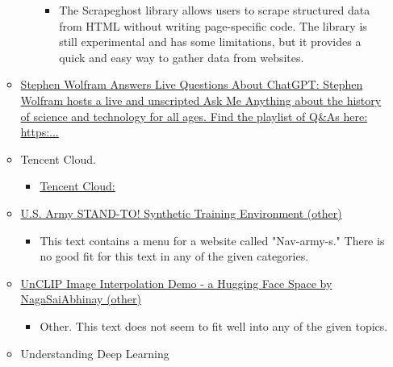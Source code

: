 \begin{itemize}
\begin{itemize}
\begin{itemize}
      \begin{itemize}
       
      \item
        The Scrapeghost library allows users to scrape structured data
        from HTML without writing page-specific code. The library is
        still experimental and has some limitations, but it provides a
        quick and easy way to gather data from websites.
      \end{itemize}
    \end{itemize}
  \item
    \href{https://youtu.be/zLnhg9kir3Q}{Stephen Wolfram Answers Live
    Questions About ChatGPT: Stephen Wolfram hosts a live and unscripted
    Ask Me Anything about the history of science and technology for all
    ages. Find the playlist of Q\&A\textquotesingle s here: https:...}
  \item
    Tencent Cloud.

    \begin{itemize}
     
    \item
      \href{https://www.tencentcloud.com/dynamic/news-details/100437?lang=en\&pg=}{Tencent
      Cloud:}
    \end{itemize}
  \item
    \href{https://www.army.mil/standto/archive/2018/03/26/}{U.S. Army
    STAND-TO! \textbar{} Synthetic Training Environment (other)}

    \begin{itemize}
     
    \item
      This text contains a menu for a website called "Nav-army-s." There
      is no good fit for this text in any of the given categories.
    \end{itemize}
  \item
    \href{https://huggingface.co/spaces/nagasaiabhinay/unclip_image_interpolation_demo}{UnCLIP
    Image Interpolation Demo - a Hugging Face Space by NagaSaiAbhinay
    (other)}

    \begin{itemize}
     
    \item
      Other. This text does not seem to fit well into any of the given
      topics.
    \end{itemize}
  \item
    Understanding Deep Learning

    \begin{itemize}
     

\end{itemize}
\end{itemize}
\end{itemize}
